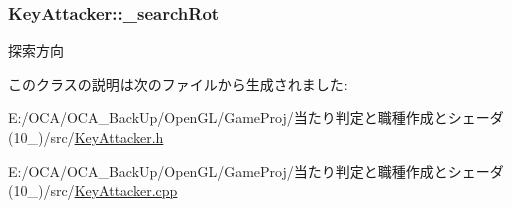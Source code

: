 \hypertarget{class_key_attacker_af84b632fc711f0b24cc0a8ffacc0a0d5}{
\subsubsection[{\-\_\-search\-Rot}]{ Key\-Attacker\-::\-\_\-search\-Rot\hspace{0.3cm}{\ttfamily [protected]}}}\label{class_key_attacker_af84b632fc711f0b24cc0a8ffacc0a0d5}


探索方向 



このクラスの説明は次のファイルから生成されました\-:\begin{DoxyCompactItemize}
\item 
E\-:/\-O\-C\-A/\-O\-C\-A\-\_\-\-Back\-Up/\-Open\-G\-L/\-Game\-Proj/当たり判定と職種作成とシェーダ(10\-\_)/src/\hyperlink{_key_attacker_8h}{Key\-Attacker.\-h}\item 
E\-:/\-O\-C\-A/\-O\-C\-A\-\_\-\-Back\-Up/\-Open\-G\-L/\-Game\-Proj/当たり判定と職種作成とシェーダ(10\-\_)/src/\hyperlink{_key_attacker_8cpp}{Key\-Attacker.\-cpp}\end{DoxyCompactItemize}
